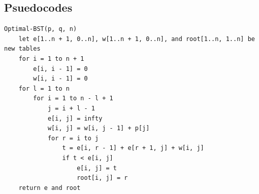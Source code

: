 \documentclass{article}
\begin{document}
\subsection*{Psuedocodes}
\lstset{basicstyle=\footnotesize}
\begin{lstlisting}
Optimal-BST(p, q, n)
    let e[1..n + 1, 0..n], w[1..n + 1, 0..n], and root[1..n, 1..n] be new tables
    for i = 1 to n + 1
        e[i, i - 1] = 0
        w[i, i - 1] = 0
    for l = 1 to n
        for i = 1 to n - l + 1
            j = i + l - 1
            e[i, j] = infty
            w[i, j] = w[i, j - 1] + p[j]
            for r = i to j
                t = e[i, r - 1] + e[r + 1, j] + w[i, j]
                if t < e[i, j]
                    e[i, j] = t
                    root[i, j] = r
    return e and root
\end{lstlisting}
\end{document}
